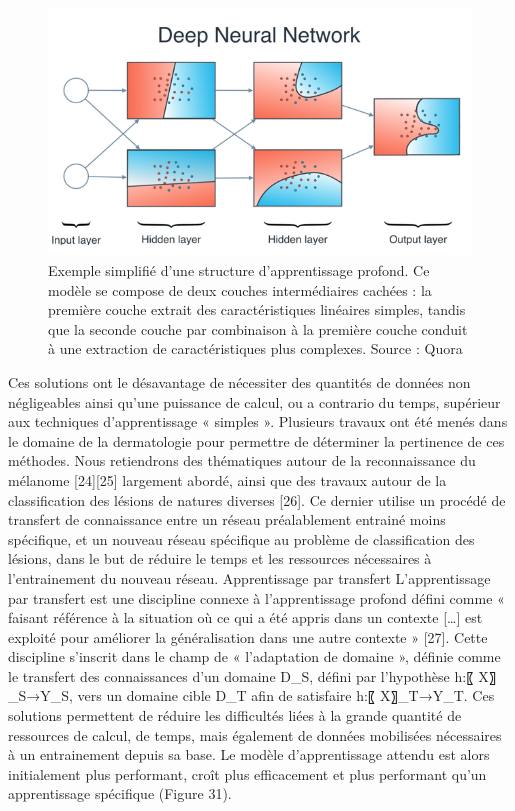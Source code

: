 \begin{figure}[H]
    \centering
    \includegraphics[width=\linewidth]{contents/chapter_3/resources/DeepUnderstanding.png}
    \caption{Exemple simplifié d'une structure d’apprentissage profond. Ce modèle se compose de deux couches intermédiaires cachées : la première couche extrait des caractéristiques linéaires simples, tandis que la seconde couche par combinaison à la première couche conduit à une extraction de caractéristiques plus complexes. Source : Quora}
    \label{fig:chapter_3:deep_understanding}
\end{figure}

Ces solutions ont le désavantage de nécessiter des quantités de données non négligeables ainsi qu’une puissance de calcul, ou a contrario du temps, supérieur aux techniques d’apprentissage « simples ».
Plusieurs travaux ont été menés dans le domaine de la dermatologie pour permettre de déterminer la pertinence de ces méthodes. Nous retiendrons des thématiques autour de la reconnaissance du mélanome [24][25] largement abordé, ainsi que des travaux autour de la classification des lésions de natures diverses [26]. Ce dernier utilise un procédé de transfert de connaissance entre un réseau préalablement entrainé moins spécifique, et un nouveau réseau spécifique au problème de classification des lésions, dans le but de réduire le temps et les ressources nécessaires à l’entrainement du nouveau réseau.
Apprentissage par transfert
L’apprentissage par transfert est une discipline connexe à l’apprentissage profond défini comme « faisant référence à la situation où ce qui a été appris dans un contexte […] est exploité pour améliorer la généralisation dans une autre contexte » [27]. Cette discipline s’inscrit dans le champ de « l’adaptation de domaine », définie comme le transfert des connaissances d’un domaine D_S, défini par l’hypothèse  h:〖 X〗_S→Y_S, vers un domaine cible D_T afin de satisfaire h:〖 X〗_T→Y_T.
Ces solutions permettent de réduire les difficultés liées à la grande quantité de ressources de calcul, de temps, mais également de données mobilisées nécessaires à un entrainement depuis sa base. Le modèle d’apprentissage attendu est alors initialement plus performant, croît plus efficacement et plus performant qu’un apprentissage spécifique (Figure 31).

